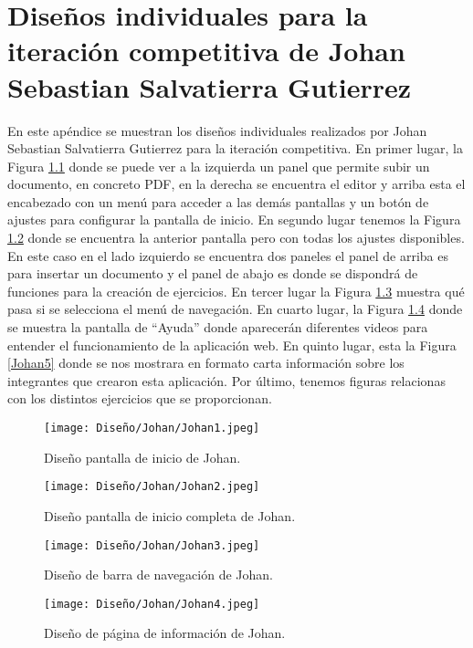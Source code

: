 \chapter{Diseños individuales para la iteración competitiva de Johan Sebastian Salvatierra Gutierrez}
\label{ape:disenyoJohan}

En este apéndice se muestran los diseños individuales realizados por Johan Sebastian Salvatierra Gutierrez para la iteración competitiva. En primer lugar, la Figura \ref{Johan1} donde se puede ver a la izquierda un panel que permite subir un documento, en concreto PDF, en la derecha se encuentra el editor y arriba esta el encabezado con un menú para acceder a las demás pantallas y un botón de ajustes para configurar la pantalla de inicio. En segundo lugar tenemos la Figura \ref{Johan2} donde se encuentra la anterior pantalla pero con todas los ajustes disponibles. En este caso en el lado izquierdo se encuentra dos paneles el panel de arriba es para insertar un documento y el panel de abajo es donde se dispondrá de funciones para la creación de ejercicios. En tercer lugar la Figura \ref{Johan3} muestra qué pasa si se selecciona el menú de navegación. En cuarto lugar, la Figura \ref{Johan4} donde se muestra la pantalla de ``Ayuda'' donde aparecerán diferentes videos para entender el funcionamiento de la aplicación web. En quinto lugar, esta la Figura \ref{Johan5} donde se nos mostrara en formato carta información sobre los integrantes que crearon esta aplicación. Por último, tenemos figuras relacionas con los distintos ejercicios que se proporcionan.

\begin{figure}[ht!]
  \centering
  \texttt{[image: Diseño/Johan/Johan1.jpeg]}
  \caption{Diseño pantalla de inicio de Johan.}
  \label{Johan1}
\end{figure}

\begin{figure}[ht!]
  \centering
  \texttt{[image: Diseño/Johan/Johan2.jpeg]}
  \caption{Diseño pantalla de inicio completa de Johan.}
  \label{Johan2}
\end{figure}

\begin{figure}[ht!]
  \centering
  \texttt{[image: Diseño/Johan/Johan3.jpeg]}
  \caption{Diseño de barra de navegación de Johan.}
  \label{Johan3}
\end{figure}

\begin{figure}[ht!]
  \centering
  \texttt{[image: Diseño/Johan/Johan4.jpeg]}
  \caption{Diseño de página de información de Johan.}
  \label{Johan4}
\end{figure}


